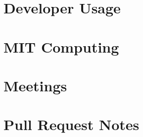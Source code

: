 \documentclass[oneside]{book}
\begin{document}
\chapter{Developer Usage}
    
    
    
\chapter{MIT Computing}
   
   

\chapter{Meetings}
    
    
\chapter{Pull Request Notes}
   
    
\iffalse



\chapter{Resources}
    
    
\fi
\end{document}
